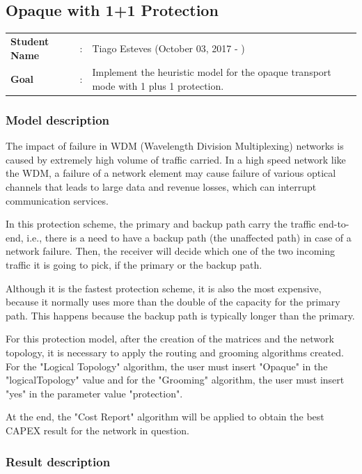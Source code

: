 \clearpage

\subsection{Opaque with 1+1 Protection}\label{heuristic_Opaque_Protection}
\begin{tcolorbox}	
\begin{tabular}{p{2.75cm} p{0.2cm} p{10.5cm}} 	
\textbf{Student Name}  &:& Tiago Esteves    (October 03, 2017 - )\\
\textbf{Goal}          &:& Implement the heuristic model for the opaque transport mode with 1 plus 1 protection.
\end{tabular}
\end{tcolorbox}

\subsubsection{Model description}

The impact of failure in WDM (Wavelength Division Multiplexing) networks is caused by extremely high volume of traffic carried. In a high speed network like the WDM, a failure of a network element may cause failure of various optical channels that leads to large data and revenue losses, which can interrupt communication services.

In this protection scheme, the primary and backup path carry the traffic end-to-end, i.e., there is a need to have a backup path (the unaffected path) in case of a network failure. Then, the receiver will decide which one of the two incoming traffic it is going to pick, if the primary or the backup path.

Although it is the fastest protection scheme, it is also the most expensive, because it normally uses more than the double of the capacity for the primary path. This happens because the backup path is typically longer than the primary.

For this protection model, after the creation of the matrices and the network topology, it is necessary to apply the routing and grooming algorithms created. For the "Logical Topology" algorithm, the user must insert "Opaque" in the "logicalTopology" value and for the "Grooming" algorithm, the user must insert "yes" in the parameter value "protection".

At the end, the "Cost Report" algorithm will be applied to obtain the best CAPEX result for the network in question.

\subsubsection{Result description}

